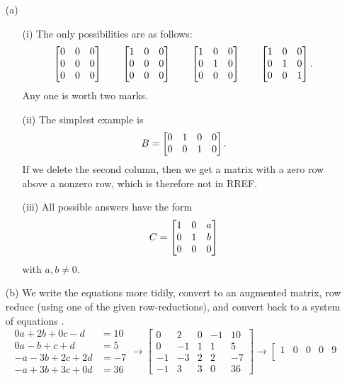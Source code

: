 \documentclass[a4paper]{article}
\begin{document}
\begin{solution}
 \begin{itemize}
  \item[(a)]
   \begin{itemize}
    \item[(i)] The only possibilities are as follows:
     \[ \left[\begin{matrix} 0&0&0 \\ 0&0&0 \\ 0&0&0 \end{matrix}\right] \qquad
        \left[\begin{matrix} 1&0&0 \\ 0&0&0 \\ 0&0&0 \end{matrix}\right] \qquad
        \left[\begin{matrix} 1&0&0 \\ 0&1&0 \\ 0&0&0 \end{matrix}\right] \qquad
        \left[\begin{matrix} 1&0&0 \\ 0&1&0 \\ 0&0&1 \end{matrix}\right].
     \]
     Any one is worth two marks. 
    \item[(ii)] The simplest example is
     \[ B = \left[\begin{matrix} 0&1&0&0 \\ 0&0&1&0 \end{matrix}\right]. \]
     If we delete the second column, then we get a matrix with a zero
     row above a nonzero row, which is therefore not in RREF. 
    \item[(iii)] All possible answers have the form
     \[ C = \left[\begin{matrix} 1 & 0 & a \\ 0 & 1 & b \\ 0 & 0 & 0 \end{matrix}\right] \]
     with $a,b\neq 0$. 
   \end{itemize}
  \item[(b)] We write the equations more tidily, convert to an
   augmented matrix, row reduce (using one of the given
   row-reductions), and convert back to a system of equations .
   \[
    \begin{array}{rl}
     0a +2b + 0c -  d &= 10 \\
     0a - b +  c +  d &=  5 \\
     -a -3b + 2c + 2d &= -7 \\
     -a +3b + 3c + 0d &= 36 
    \end{array}
    \to 
    \left[\begin{array}{cccc|c}
      0 &  2 &  0 & -1 & 10 \\
      0 & -1 &  1 &  1 &  5 \\
     -1 & -3 &  2 &  2 & -7 \\
     -1 &  3 &  3 &  0 & 36
    \end{array}\right]
    \to 
    \left[\begin{array}{cccc|c}
      1 & 0 & 0 & 0 & 9 \\

\end{array}\]
\end{itemize}
\end{solution}
\end{document}
